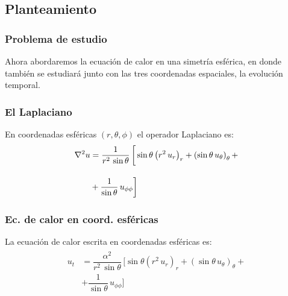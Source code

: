 \documentclass[12pt]{beamer}
\begin{document}
\subsection{Planteamiento}
\begin{frame}
\frametitle{Problema de estudio}
Ahora abordaremos la ecuación de calor en una simetría esférica, en donde también se estudiará junto con las tres coordenadas espaciales, la evolución temporal.
\end{frame}
\begin{frame}
\frametitle{El Laplaciano}
En coordenadas esféricas $(r, \theta, \phi)$ el operador Laplaciano es:
\begin{align}
\begin{aligned}
\laplacian{u} &= \dfrac{1}{r^{2} \, \sin \theta} \, \bigg[ \sin \theta \left( r^{2} \, u_{r} \right)_{r} + \left( \sin \theta \, u_{\theta} \right)_{\theta} + \\[1em]
&+ \dfrac{1}{\sin \theta} \, u_{\phi \phi} \bigg] 
\end{aligned}
\label{eq:ecuacion_02_286}
\end{align}
\end{frame}
\begin{frame}
\frametitle{Ec. de calor en coord. esféricas}
La ecuación de calor escrita en coordenadas esféricas es:
\begin{align}
\begin{aligned}
u_{t} &= \dfrac{\alpha^{2}}{r^{2} \, \sin \theta} \, \bigg[ \sin \theta \left( r^{2} \, u_{r} \right)_{r} + \left( \sin \theta \, u_{\theta} \right)_{\theta} + \\[1em]
&+ \dfrac{1}{\sin \theta} \, u_{\phi \phi} \bigg] 
\end{aligned}
\label{eq:ecuacion_02_287}
\end{align}
\end{frame}
\end{document}
